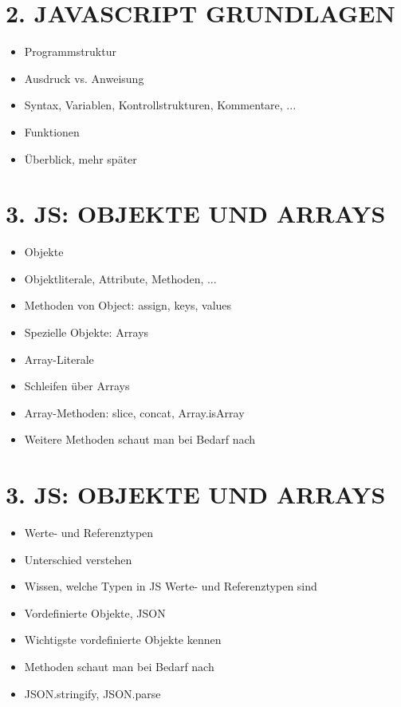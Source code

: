 \documentclass[10pt]{article}
\begin{document}
\section*{2. JAVASCRIPT GRUNDLAGEN}
\begin{itemize}
  \item Programmstruktur
  \item Ausdruck vs. Anweisung
  \item Syntax, Variablen, Kontrollstrukturen, Kommentare, ...
  \item Funktionen
  \item Überblick, mehr später
\end{itemize}

\section*{3. JS: OBJEKTE UND ARRAYS}
\begin{itemize}
  \item Objekte
  \item Objektliterale, Attribute, Methoden, ...
  \item Methoden von Object: assign, keys, values
  \item Spezielle Objekte: Arrays
  \item Array-Literale
  \item Schleifen über Arrays
  \item Array-Methoden: slice, concat, Array.isArray
  \item Weitere Methoden schaut man bei Bedarf nach
\end{itemize}

\section*{3. JS: OBJEKTE UND ARRAYS}
\begin{itemize}
  \item Werte- und Referenztypen
  \item Unterschied verstehen
  \item Wissen, welche Typen in JS Werte- und Referenztypen sind
  \item Vordefinierte Objekte, JSON
  \item Wichtigste vordefinierte Objekte kennen
  \item Methoden schaut man bei Bedarf nach
  \item JSON.stringify, JSON.parse
\end{itemize}
\end{document}
